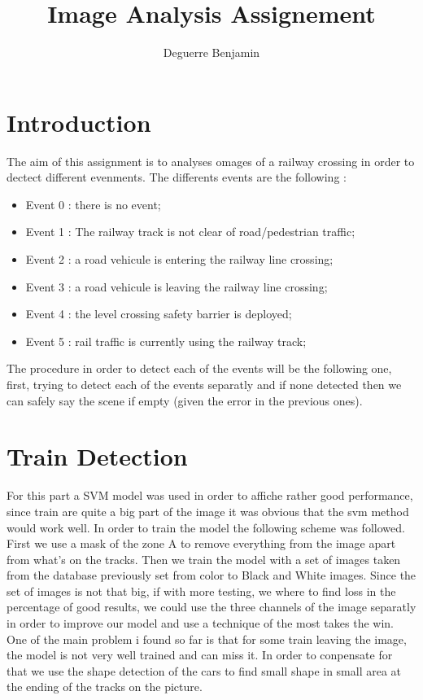 \documentclass{report}
\title{Image Analysis Assignement}
\author{Deguerre Benjamin}
\begin{document}
\maketitle
\section{Introduction}
The aim of this assignment is to analyses omages of a railway crossing in order to dectect different evenments. The differents events are the following :
  \begin{itemize}
    \item Event 0 : there is no event;
    \item Event 1 : The railway track is not clear of road/pedestrian traffic;
    \item Event 2 : a road vehicule is entering the railway line crossing;
    \item Event 3 : a road vehicule is leaving the railway line crossing;
    \item Event 4 : the level crossing safety barrier is deployed;
    \item Event 5 : rail traffic is currently using the railway track;
  \end{itemize}

The procedure in order to detect each of the events will be the following one, first, trying to detect each of the events separatly and if none detected then we can safely say the scene if empty (given the error in the previous ones).

\section{Train Detection}
For this part a SVM model was used in order to affiche rather good performance, since train are quite a big part of the image it was obvious that the svm method would work well.
In order to train the model the following scheme was followed. First we use a mask of the zone A to remove everything from the image apart from what's on the tracks. Then we train the model with a set of images taken from the database previously set from color to Black and White images. Since the set of images is not that big, if with more testing, we where to find loss in the percentage of good results, we could use the three channels of the image separatly in order to improve our model and use a technique of the most takes the win.
One of the main problem i found so far is that for some train leaving the image, the model is not very well trained and can miss it. In order to conpensate for that we use the shape detection of the cars to find small shape in small area at the ending of the tracks on the picture.
\end{document}
